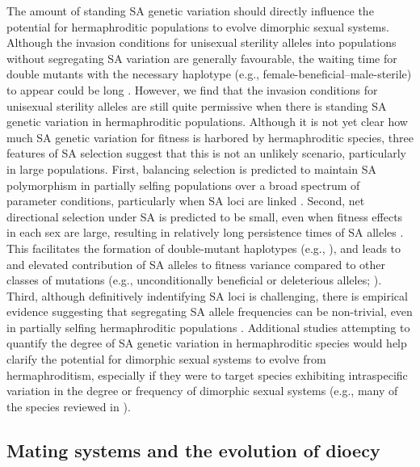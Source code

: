 \documentclass[9pt,twocolumn,twoside,lineno]{gsajnl}
\begin{document}
The amount of standing SA genetic variation should directly influence the potential for hermaphroditic populations to evolve dimorphic sexual systems. Although the invasion conditions for unisexual sterility alleles into populations without segregating SA variation are generally favourable, the waiting time for double mutants with the necessary haplotype (e.g., female-beneficial--male-sterile) to appear could be long \citep{WeinreichChao2005,ConnallonClark2010}. However, we find that the invasion conditions for unisexual sterility alleles are still quite permissive when there is standing SA genetic variation in hermaphroditic populations. Although it is not yet clear how much SA genetic variation for fitness is harbored by hermaphroditic species, three features of SA selection suggest that this is not an unlikely scenario, particularly in large populations. First, balancing selection is predicted to maintain SA polymorphism in partially selfing populations over a broad spectrum of parameter conditions, particularly when SA loci are linked \citep{Patten2010,JordanConnallon2014,Olito2016}. Second, net directional selection under SA is predicted to be small, even when fitness effects in each sex are large, resulting in relatively long persistence times of SA alleles \citep{ConnallonClark2012}. This facilitates the formation of double-mutant haplotypes (e.g., \citealt{WeinreichChao2005}), and leads to and elevated contribution of SA alleles to fitness variance compared to other classes of mutations (e.g., unconditionally beneficial or deleterious alleles; \citealt{ConnallonClark2012}). Third, although definitively indentifying SA loci is challenging, there is empirical evidence suggesting that segregating SA allele frequencies can be non-trivial, even in partially selfing hermaphroditic populations \citep{Barson2015,LeeKelly2015}. Additional studies attempting to quantify the degree of SA genetic variation in hermaphroditic species would help clarify the potential for dimorphic sexual systems to evolve from hermaphroditism, especially if they were to target species exhibiting intraspecific variation in the degree or frequency of dimorphic sexual systems (e.g., many of the species reviewed in \citealt{SakaiWeller1999,Barrett2010,Renner2014}).


\subsection{Mating systems and the evolution of dioecy}
\end{document}
